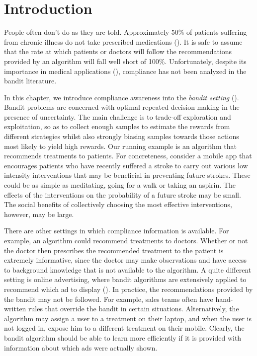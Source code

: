 \section{Introduction}
\label{bandintro}

People often don't do as they are told. Approximately 50\% of patients suffering from chronic illness do not take prescribed medications (\cite{sabate:03}). It is safe to assume that the rate at which patients or doctors will follow the recommendations provided by an algorithm will fall well short of 100\%. 
Unfortunately, despite its importance in medical applications (\cite{vrijens:12,hugtenburg:13}), compliance has not been analyzed in the bandit literature. 

In this chapter, we introduce compliance awareness into the \emph{bandit setting} (\cite{bubeck:12}).
Bandit problems are concerned with optimal repeated decision-making in the presence of uncertainty. The main challenge is to trade-off exploration and exploitation, so as to collect enough samples to estimate the rewards from different strategies whilst also strongly biasing samples towards those actions most likely to yield high rewards.  
Our running example is an algorithm that recommends treatments to patients. For concreteness, consider a mobile app that encourages patients who have recently suffered a stroke to carry out various low intensity interventions that may be beneficial in preventing future strokes.
These could be as simple as meditating, going for a walk or taking an aspirin.
The effects of the interventions on the probability of a future stroke may be small. The social benefits of collectively choosing the most effective interventions, however, may be large.
 
There are other settings in which compliance information is available. For example, an algorithm could recommend treatments to doctors. Whether or not the doctor then prescribes the recommended treatment to the patient is extremely informative, since the doctor may make observations and have access to background knowledge that is not available to the algorithm.
A quite different setting is online advertising, where bandit algorithms are extensively applied to recommend which ad to display (\cite{graepel:10,mcmahan:13}). In practice, the recommendations provided by the bandit may not be followed. For example, sales teams often have hand-written rules that override the bandit in certain situations. Alternatively, the algorithm may assign a user to a treatment on their laptop, and when the user is not logged in, expose him to a different treatment on their mobile.
Clearly, the bandit algorithm should be able to learn more efficiently if it is provided  with information about which ads were actually shown.

